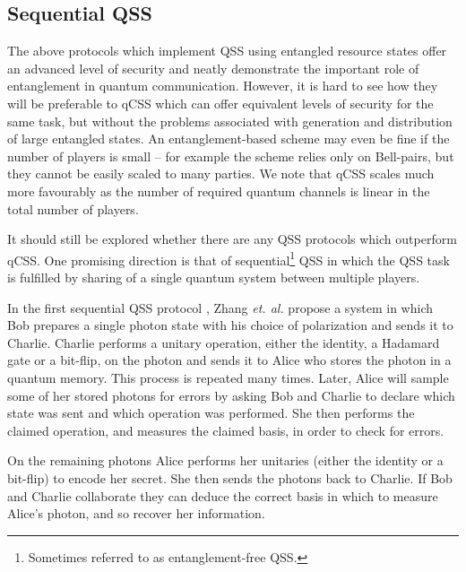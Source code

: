 


\subsection{Sequential QSS}
The above protocols which implement QSS using entangled resource states offer an advanced level of security and neatly demonstrate the important role of entanglement in quantum communication. However, it is hard to see how they will be preferable to qCSS which can offer equivalent levels of security for the same task, but without the problems associated with generation and distribution of large entangled states. An entanglement-based scheme may even be fine if the number of players is small -- for example the scheme \cite{Karlsson1999} relies only on Bell-pairs, but they cannot be easily scaled to many parties. We note that qCSS scales much more favourably as the number of required quantum channels is linear in the total number of players.

It should still be explored whether there are any QSS protocols which outperform qCSS. One promising direction is that of sequential\footnote{Sometimes referred to as entanglement-free QSS.} QSS in which the QSS task is fulfilled by sharing of a single quantum system between multiple players.

In the first sequential QSS protocol \cite{Zhang2005}, Zhang \emph{et. al.} propose a system in which Bob prepares a single photon state with his choice of polarization and sends it to Charlie. Charlie performs a unitary operation, either the identity, a Hadamard gate or a bit-flip, on the photon and sends it to Alice who stores the photon in a quantum memory. This process is repeated many times. Later, Alice will sample some of her stored photons for errors by asking Bob and Charlie to declare which state was sent and which operation was performed. She then performs the claimed operation, and measures the claimed basis, in order to check for errors.

On the remaining photons Alice performs her unitaries (either the identity or a bit-flip) to encode her secret. She then sends the photons back to Charlie. %
If Bob and Charlie collaborate they can deduce the correct basis in which to measure Alice's photon, and so recover her information.



